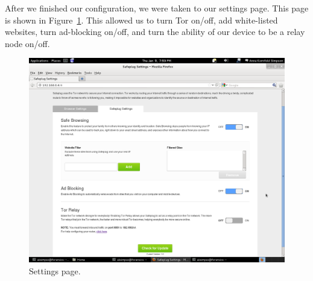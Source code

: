 After we finished our configuration, we were taken to our settings page.  This page is shown in Figure~\ref{fig:settings}.  This allowed us to turn Tor on/off, add white-listed websites, turn ad-blocking on/off, and turn the ability of our device to be a relay node on/off.  

\begin{figure}[htb]
\begin{center}
\includegraphics[width=.75\textwidth]{settings}
\caption{Settings page.}
\label{fig:settings}
\end{center}
\end{figure}

